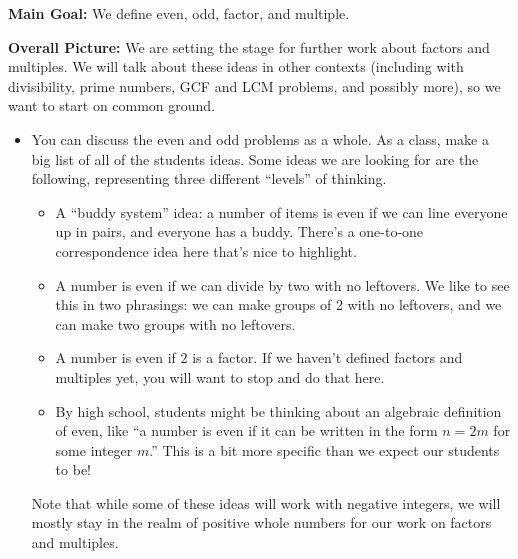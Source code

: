 \documentclass[nooutcomes,noauthor,handout]{ximera}
\begin{document}
\newpage
\begin{instructorNotes}

{\bf Main Goal:} We define even, odd, factor, and multiple.


{\bf Overall Picture:} We are setting the stage for further work about factors and multiples. We will talk about these ideas in other contexts (including with divisibility, prime numbers, GCF and LCM problems, and possibly more), so we want to start on common ground.

\begin{itemize}
\item You can discuss the even and odd problems as a whole. As a class, make a big list of all of the students ideas. Some ideas we are looking for are the following, representing three different ``levels'' of thinking.

\begin{itemize}
	\item A ``buddy system'' idea: a number of items is even if we can line everyone up in pairs, and everyone has a buddy. There's a one-to-one correspondence idea here that's nice to highlight.
	\item A number is even if we can divide by two with no leftovers. We like to see this in two phrasings: we can make groups of 2 with no leftovers, and we can make two groups with no leftovers.
	\item A number is even if $2$ is a factor. If we haven't defined factors and multiples yet, you will want to stop and do that here.
	\item By high school, students might be thinking about an algebraic definition of even, like ``a number is even if it can be written in the form $n = 2m$ for some integer $m$.'' This is a bit more specific than we expect our students to be!
\end{itemize}
Note that while some of these ideas will work with negative integers, we will mostly stay in the realm of positive whole numbers for our work on factors and multiples.


\end{itemize}
\end{instructorNotes}
\end{document}
